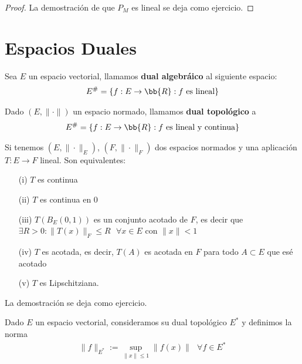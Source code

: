 \begin{coro}
\begin{proof}
        La demostración de que $P_M$ es lineal se deja como ejercicio.
    \end{proof}
\end{coro}

\section{Espacios Duales}

\begin{definicion}
    Sea $E$ un espacio vectorial, llamamos \textbf{dual algebráico} al siguiente espacio:
    \begin{gather*}
        E^\# = \{f: E \to \bb{R}: f \text{ es lineal}\}
    \end{gather*}
\end{definicion}

\begin{definicion}
   Dado $(E, \|\cdot\|)$ un espacio normado, llamamos \textbf{dual topológico} a
    \begin{gather*}
        E^\# = \{f: E \to \bb{R}: f \text{ es lineal y continua}\}
    \end{gather*} 
\end{definicion}


\begin{observacion}
    Si tenemos $(E, \|\cdot\|_E)$, $(F, \|\cdot\|_F)$ dos espacios normados y una aplicación $T:E\to F$ lineal. Son equivalentes:
    \begin{enumerate}
        \item[(i)] $T$ es continua
        \item[(ii)] $T$ es continua en $0$
        \item[(iii)] $T(B_E(0,1))$ es un conjunto acotado de $F$, es decir que $\exists R>0 : \|T(x)\|_F \leq R\ \ \ \forall x\in E$ con $\|x\|<1$
        \item[(iv)] $T$ es acotada, es decir, $T(A)$ es acotada en $F$ para todo $A\subset E$ que esé acotado
        \item[(v)] $T$ es Lipschitziana.
    \end{enumerate}
    La demostración se deja como ejercicio.
\end{observacion}

\begin{definicion}
    Dado $E$ un espacio vectorial, consideramos su dual topológico $E^*$ y definimos la norma
    \begin{gather*}
        \|f\|_{E^*} := \sup_{\|x\|\leq 1} \|f(x)\| \ \ \ \forall f \in E^*
    \end{gather*}
\end{definicion}

